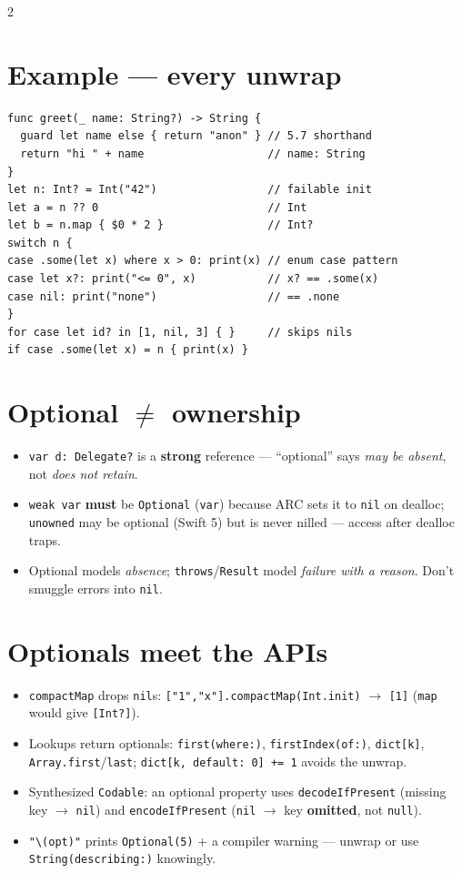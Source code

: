 \documentclass[8pt]{extarticle}
\begin{document}
\begin{multicols}{2}
\section{Example — every unwrap}
\begin{lstlisting}[language=SwiftSheet]
func greet(_ name: String?) -> String {
  guard let name else { return "anon" } // 5.7 shorthand
  return "hi " + name                   // name: String
}
let n: Int? = Int("42")                 // failable init
let a = n ?? 0                          // Int
let b = n.map { $0 * 2 }                // Int?
switch n {
case .some(let x) where x > 0: print(x) // enum case pattern
case let x?: print("<= 0", x)           // x? == .some(x)
case nil: print("none")                 // == .none
}
for case let id? in [1, nil, 3] { }     // skips nils
if case .some(let x) = n { print(x) }
\end{lstlisting}

\section{Optional $\neq$ ownership}
\begin{itemize}
  \item \texttt{var d: Delegate?} is a \textbf{strong} reference — ``optional'' says
        \emph{may be absent}, not \emph{does not retain}.
  \item \texttt{weak var} \textbf{must} be \texttt{Optional} (\texttt{var}) because ARC
        sets it to \texttt{nil} on dealloc; \texttt{unowned} may be optional (Swift 5)
        but is never nilled — access after dealloc traps.
  \item Optional models \emph{absence}; \texttt{throws}/\texttt{Result} model
        \emph{failure with a reason}. Don't smuggle errors into \texttt{nil}.
\end{itemize}

\section{Optionals meet the APIs}
\begin{itemize}
  \item \texttt{compactMap} drops \texttt{nil}s: \texttt{["1","x"].compactMap(Int.init)} $\to$ \texttt{[1]}
        (\texttt{map} would give \texttt{[Int?]}).
  \item Lookups return optionals: \texttt{first(where:)}, \texttt{firstIndex(of:)},
        \texttt{dict[k]}, \texttt{Array.first}/\texttt{last}; \texttt{dict[k, default: 0] += 1}
        avoids the unwrap.
  \item Synthesized \texttt{Codable}: an optional property uses \texttt{decodeIfPresent}
        (missing key $\to$ \texttt{nil}) and \texttt{encodeIfPresent} (\texttt{nil} $\to$ key
        \textbf{omitted}, not \texttt{null}).
  \item \texttt{"\textbackslash(opt)"} prints \texttt{Optional(5)} + a compiler warning —
        unwrap or use \texttt{String(describing:)} knowingly.
\end{itemize}


\end{multicols}
\end{document}
